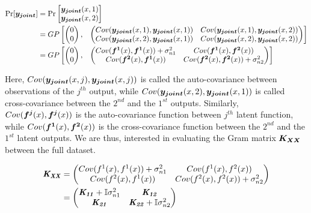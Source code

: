 \begin{equation}
\begin{aligned}
       \Pr[\boldsymbol{y_{joint}}] & = \Pr\begin{bmatrix}   \boldsymbol{y_{joint}}(x, 1) \\ \boldsymbol{y_{joint}}(x, 2)   \end{bmatrix} \\
& = GP\begin{bmatrix}
   \begin{pmatrix}
   0\\ 
   0
   \end{pmatrix} ,& 
   \begin{pmatrix}
    Cov(\boldsymbol{y_{joint}}(x, 1), \boldsymbol{y_{joint}}(x, 1))  & Cov(\boldsymbol{y_{joint}}(x, 1), \boldsymbol{y_{joint}}(x, 2))\\ 
    Cov(\boldsymbol{y_{joint}}(x, 2), \boldsymbol{y_{joint}}(x, 1))     & Cov(\boldsymbol{y_{joint}}(x, 2), \boldsymbol{y_{joint}}(x, 2))
   \end{pmatrix}
   \end{bmatrix} \\
& = GP\begin{bmatrix}
   \begin{pmatrix}
   0\\ 
   0
   \end{pmatrix} ,& 
   \begin{pmatrix}
    Cov(\boldsymbol{f^1}(x), \boldsymbol{f^1}(x)) + \sigma_{n1}^2 & Cov(\boldsymbol{f^1}(x), \boldsymbol{f^2}(x))\\ 
    Cov(\boldsymbol{f^2}(x), \boldsymbol{f^1}(x))     & Cov(\boldsymbol{f^2}(x), \boldsymbol{f^2}(x)) + \sigma_{n2}^2
   \end{pmatrix}
   \end{bmatrix}
\end{aligned}
   \end{equation}

Here, $Cov(\boldsymbol{y_{joint}}(x, j), \boldsymbol{y_{joint}}(x, j))$ is called the  auto-covariance between observations of the $j^{th}$ output, while $Cov(\boldsymbol{y_{joint}}(x, 2), \boldsymbol{y_{joint}}(x, 1))$ is called cross-covariance between the $2^{nd}$ and the $1^{st}$ outputs. Similarly, $Cov(\boldsymbol{f^j}(x), \boldsymbol{f^j}(x))$ is the auto-covariance function between $j^{th}$ latent function, while $Cov(\boldsymbol{f^1}(x), \boldsymbol{f^2}(x))$ is the cross-covariance function between the $2^{nd}$ and the $1^{st}$ latent outputs. We are thus, interested in evaluating the Gram matrix $\boldsymbol{K_{XX}}$ between the full dataset. 

\begin{align}
      \bm{\mathit{K_{XX}}} & =  \begin{pmatrix}
    Cov(f^1(x), f^1(x)) + \sigma_{n1}^2  & Cov(f^1(x), f^2(x))\\ 
    Cov(f^2(x), f^1(x))     & Cov(f^2(x), f^2(x)) + \sigma_{n2}^2
   \end{pmatrix} \\
   & = \begin{pmatrix}
    \bm{\mathit{K_{11}}} + \mathbb{I}\sigma_{n1}^2 & \bm{\mathit{K_{12}}}\\ 
    \bm{\mathit{K_{21}}}    & \bm{\mathit{K_{22}}} + \mathbb{I}\sigma_{n2}^2
   \end{pmatrix}
\end{align}


